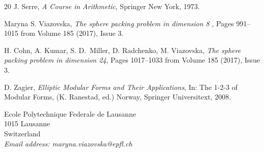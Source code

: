 \begin{thebibliography}{20}
 {\sc J. Serre}, {\em A Course in Arithmetic}, Springer New York, 1973.




 {\sc Maryna S. Viazovska}, {\em The sphere packing problem in dimension 8	},
Pages 991--1015 from Volume 185 (2017), Issue 3.

 {\sc H. Cohn, A. Kumar, S. D.\ Miller, D. Radchenko, M. Viazovska}, \emph{The sphere packing problem in dimension 24},
Pages 1017--1033 from Volume 185 (2017), Issue 3.

 {\sc D. Zagier}, {\em Elliptic Modular Forms and Their Applications}, In:  The 1-2-3 of Modular Forms, (K. Ranestad, ed.) Norway, Springer Universitext, 2008.

\end{thebibliography}

\newpage

{\footnotesize
\noindent
Ecole Polytechnique Federale de Lausanne\\
1015 Lausanne\\
Switzerland\\
{\it Email address: maryna.viazovska@epfl.ch}}
